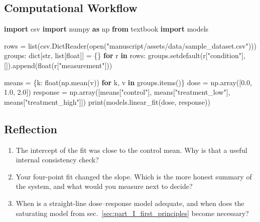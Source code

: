 \documentclass[
]{article}
\newenvironment{Shaded}{}{}
\newcommand{\BuiltInTok}[1]{\textcolor[rgb]{0.00,0.50,0.00}{#1}}
\newcommand{\ControlFlowTok}[1]{\textcolor[rgb]{0.00,0.44,0.13}{\textbf{#1}}}
\newcommand{\FloatTok}[1]{\textcolor[rgb]{0.25,0.63,0.44}{#1}}
\newcommand{\ImportTok}[1]{\textcolor[rgb]{0.00,0.50,0.00}{\textbf{#1}}}
\newcommand{\KeywordTok}[1]{\textcolor[rgb]{0.00,0.44,0.13}{\textbf{#1}}}
\newcommand{\NormalTok}[1]{#1}
\newcommand{\OperatorTok}[1]{\textcolor[rgb]{0.40,0.40,0.40}{#1}}
\newcommand{\StringTok}[1]{\textcolor[rgb]{0.25,0.44,0.63}{#1}}
\providecommand{\tightlist}{%
  \setlength{\itemsep}{0pt}\setlength{\parskip}{0pt}}
\theoremstyle{plain}
\theoremstyle{definition}
\begin{document}
\subsection{Computational Workflow}\label{computational-workflow-10}

\begin{Shaded}
\begin{Highlighting}[]
\ImportTok{import}\NormalTok{ csv}
\ImportTok{import}\NormalTok{ numpy }\ImportTok{as}\NormalTok{ np}
\ImportTok{from}\NormalTok{ textbook }\ImportTok{import}\NormalTok{ models}

\NormalTok{rows }\OperatorTok{=} \BuiltInTok{list}\NormalTok{(csv.DictReader(}\BuiltInTok{open}\NormalTok{(}\StringTok{"manuscript/assets/data/sample\_dataset.csv"}\NormalTok{)))}
\NormalTok{groups: }\BuiltInTok{dict}\NormalTok{[}\BuiltInTok{str}\NormalTok{, }\BuiltInTok{list}\NormalTok{[}\BuiltInTok{float}\NormalTok{]] }\OperatorTok{=}\NormalTok{ \{\}}
\ControlFlowTok{for}\NormalTok{ r }\KeywordTok{in}\NormalTok{ rows:}
\NormalTok{    groups.setdefault(r[}\StringTok{"condition"}\NormalTok{], []).append(}\BuiltInTok{float}\NormalTok{(r[}\StringTok{"measurement"}\NormalTok{]))}

\NormalTok{means }\OperatorTok{=}\NormalTok{ \{k: }\BuiltInTok{float}\NormalTok{(np.mean(v)) }\ControlFlowTok{for}\NormalTok{ k, v }\KeywordTok{in}\NormalTok{ groups.items()\}}
\NormalTok{dose }\OperatorTok{=}\NormalTok{ np.array([}\FloatTok{0.0}\NormalTok{, }\FloatTok{1.0}\NormalTok{, }\FloatTok{2.0}\NormalTok{])}
\NormalTok{response }\OperatorTok{=}\NormalTok{ np.array([means[}\StringTok{"control"}\NormalTok{], means[}\StringTok{"treatment\_low"}\NormalTok{], means[}\StringTok{"treatment\_high"}\NormalTok{]])}
\BuiltInTok{print}\NormalTok{(models.linear\_fit(dose, response))}
\end{Highlighting}
\end{Shaded}

\subsection{Reflection}\label{reflection-10}

\begin{enumerate}
\def\labelenumi{\arabic{enumi}.}
\tightlist
\item
  The intercept of the fit was close to the control mean. Why is that a
  useful internal consistency check?
\item
  Your four-point fit changed the slope. Which is the more honest
  summary of the system, and what would you measure next to decide?
\item
  When is a straight-line dose--response model adequate, and when does
  the saturating model from sec.~\ref{sec:part_I_first_principles}
  become necessary?
\end{enumerate}
\end{document}

